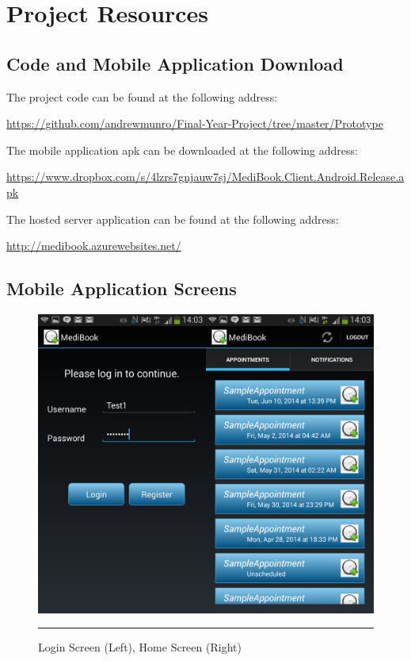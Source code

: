 
\chapter{Project Resources} %

\label{AppendixG} %


\section{Code and Mobile Application Download}

The project code can be found at the following address:

\url{https://github.com/andrewmunro/Final-Year-Project/tree/master/Prototype}

The mobile application apk can be downloaded at the following address:

\url{https://www.dropbox.com/s/4lzrs7gnjauw7sj/MediBook.Client.Android.Release.apk}

The hosted server application can be found at the following address:

\url{http://medibook.azurewebsites.net/}

\section{Mobile Application Screens}

\begin{figure}[htbp]
	\centering
\includegraphics[width=\textwidth,height=\textheight,keepaspectratio]{Figures/screens/HomeLoginScreen.png}
		\rule{35em}{0.5pt}
	\caption[Login Screen (Left), Home Screen (Right)]{Login Screen (Left), Home Screen (Right)}
	\label{fig:loginhomescreen}
\end{figure}

